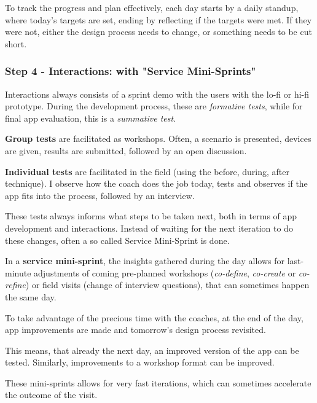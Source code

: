   To track the progress and plan effectively, each day starts by a daily standup, where today's targets are set, ending by reflecting if the targets were met. If they were not, either the design process needs to change, or something needs to be cut short.

  \subsubsection{Step 4 - Interactions: with "Service Mini-Sprints"}
  Interactions always consists of a sprint demo with the users with the lo-fi or hi-fi prototype. During the development process, these are \textit{formative tests}, while for final app evaluation, this is a \textit{summative test}.

    \textbf{Group tests} are facilitated as workshops. Often, a scenario is presented, devices are given, results are submitted, followed by an open discussion.

    \textbf{Individual tests} are facilitated in the field (using the before, during, after technique). I observe how the coach does the job today, tests and observes if the app fits into the process, followed by an interview.

    These tests always informs what steps to be taken next, both in terms of app development and interactions. Instead of waiting for the next iteration to do these changes, often a so called Service Mini-Sprint is done.

    In a \textbf{service mini-sprint}\label{mini-sprint}, the insights gathered during the day allows for last-minute adjustments of coming pre-planned workshops (\textit{co-define}, \textit{co-create} or \textit{co-refine}) or field visits (change of interview questions), that can sometimes happen the same day.

    To take advantage of the precious time with the coaches, at the end of the day, app improvements are made and tomorrow's design process revisited.

    This means, that already the next day, an improved version of the app can be tested. Similarly, improvements to a workshop format can be improved.

    These mini-sprints allows for very fast iterations, which can sometimes accelerate the outcome of the visit.

